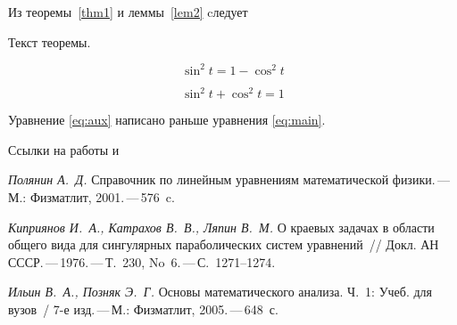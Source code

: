 Из теоремы~\ref{thm1} и леммы~\ref{lem2} cледует
\begin{aTeorema*}
	Текст теоремы.
\end{aTeorema*}




\begin{equation}
	\label{eq:aux}
	\sin^2 t = 1 - \cos^2 t
\end{equation}

\begin{equation}
	\label{eq:main}
	\sin^2 t + \cos^2 t = 1
\end{equation}


Уравнение \eqref{eq:aux} написано раньше уравнения \eqref{eq:main}.

Ссылки на работы \cite{Polyanin2001,Kipryanov1976} и \cite{Ilin2005}

\begin{thebibliography}{99}
    \textsl{Полянин А.~Д.}
	Справочник по линейным уравнениям математической фи\-зи\-ки.\,---\,М.: Физматлит, 2001.\,---\,576~c.

    \textsl{Киприянов И.~А., Катрахов В.~В., Ляпин В.~М.}
    О краевых задачах в области общего вида для сингулярных
    параболических систем уравнений~/\!/ Докл. АН СССР.\,---\,1976.\,---\,Т.~230, No~6.\,---\,С.~1271--1274.

    \textsl{Ильин В.~А., Позняк Э.~Г.}
    Основы математического анализа.  Ч.~1: Учеб. для вузов~/ 7-е изд.\,---\,М.:
    Физматлит, 2005.\,---\,648~с.

\end{thebibliography}




